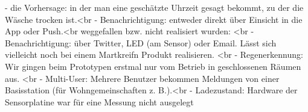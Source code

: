 \begin{description}
\begin{description}
- die Vorhersage: in der man eine geschätzte Uhrzeit gesagt bekommt, zu der die Wäsche trocken ist.<br\>
- Benachrichtigung: entweder direkt über Einsicht in die App oder Push.<br\>
weggefallen bzw. nicht realisiert wurden: <br\>
- Benachrichtigung: über Twitter, LED (am Sensor) oder Email. Lässt sich vielleicht noch bei einem Martkreifn Produkt realisieren. <br\>
- Regenerkennung: Wir gingen beim Prototypen erstmal nur vom Betrieb in geschlossenen Räumen aus. <br\>
- Multi-User: Mehrere Benutzer bekommen Meldungen von einer Basisstation (für Wohngemeinschaften z. B.).<br\>
- Ladezustand: Hardware der Sensorplatine war für eine Messung nicht ausgelegt
		\end{description}
\end{description}
